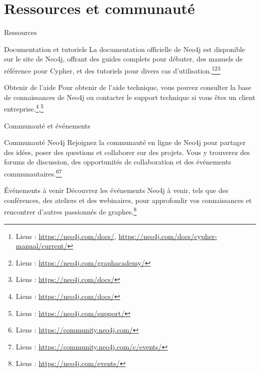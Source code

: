 \section{Ressources et communauté}

\begin{frame}{Ressources}
  \begin{block}{Documentation et tutoriels}
    La documentation officielle de Neo4j est disponible sur le site de Neo4j, offrant des guides complets pour débuter, des manuels de référence pour Cypher, et des tutoriels pour divers cas d'utilisation.\footnote{Liens : \url{https://neo4j.com/docs/}, \url{https://neo4j.com/docs/cypher-manual/current/}}\footnote{Liens : \url{https://neo4j.com/graphacademy/}}\footnote{Liens : \url{https://neo4j.com/docs/}} 
  \end{block}
  \begin{block}{Obtenir de l'aide}
    Pour obtenir de l'aide technique, vous pouvez consulter la base de connaissances de Neo4j ou contacter le support technique si vous êtes un client entreprise.\footnote{Liens : \url{https://neo4j.com/docs/}},\footnote{Liens : \url{https://neo4j.com/support/}} 
  \end{block}
\end{frame}

\begin{frame}{Communauté et événements}
  \begin{block}{Communauté Neo4j}
    Rejoignez la communauté en ligne de Neo4j pour partager des idées, poser des questions et collaborer sur des projets. Vous y trouverez des forums de discussion, des opportunités de collaboration et des événements communautaires.\footnote{Liens : \url{https://community.neo4j.com/}}\footnote{Liens : \url{https://community.neo4j.com/c/events/}} 
  \end{block}
  \begin{block}{Événements à venir}
    Découvrez les événements Neo4j à venir, tels que des conférences, des ateliers et des webinaires, pour approfondir vos connaissances et rencontrer d'autres passionnés de graphes.\footnote{Liens : \url{https://neo4j.com/events/}}
  \end{block}
\end{frame}

